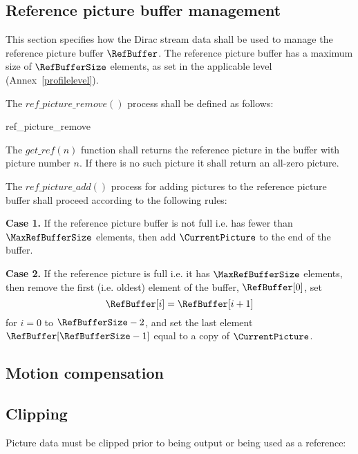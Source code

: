 \subsection{Reference picture buffer management}
\label{refbuffer}

This section specifies how the Dirac stream data shall be used to manage the reference 
picture buffer $\RefBuffer$. The reference picture buffer has a maximum size of
$\RefBufferSize$ elements, as set in the applicable level (Annex~\ref{profilelevel}).

The $ref\_picture\_remove()$ process shall be defined as
follows:

\begin{pseudo}{ref\_picture\_remove}{}
            \bsCODE{\RefBuffer[j]=\RefBuffer[j+1]}
        \bsEND
    \bsEND
\bsEND
\end{pseudo}

The $get\_ref(n)$ function shall returns the reference picture in the buffer with 
picture number $n$.  If there is no such picture it shall return an all-zero picture.

The $ref\_picture\_add()$ process for adding pictures to the reference picture
buffer shall proceed according to the following rules:

{\bf Case 1.} If the reference picture buffer is not full i.e. has fewer than $\MaxRefBufferSize$ elements,
then add $\CurrentPicture$ to the end of the buffer. 

{\bf Case 2.} If the reference picture is full i.e. it has $\MaxRefBufferSize$ elements, then remove the
first (i.e. oldest) element of the buffer, $\RefBuffer[0]$, set
\[\RefBuffer[i] = \RefBuffer[i+1] \]
for $i=0$ to $\RefBufferSize-2$, and set the last element $\RefBuffer[\RefBufferSize-1]$ equal to
a copy of $\CurrentPicture$.



\subsection{Motion compensation}


\subsection{Clipping}
\label{pictureclip}

Picture data must be clipped prior to being output or being
used as a reference:

